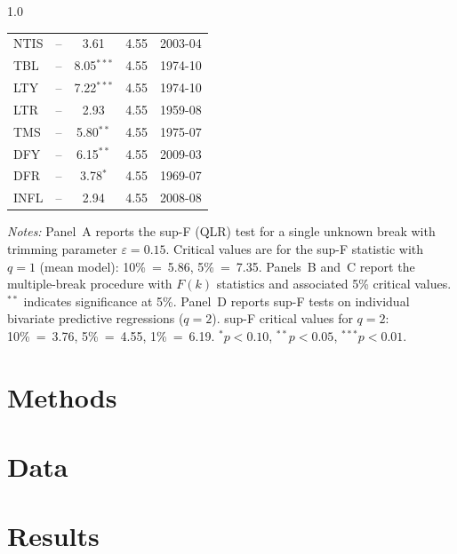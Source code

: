 \documentclass[a4paper,11pt]{article}
\begin{document}
\begin{spacing}{1.0}
\begin{table}[H]
\begin{tabular}{@{}lcccl@{}}
NTIS  & {--} &  3.61            & 4.55 & 2003-04 \\
TBL   & {--} &  8.05{$^{***}$} & 4.55 & 1974-10 \\
LTY   & {--} &  7.22{$^{***}$} & 4.55 & 1974-10 \\
LTR   & {--} &  2.93            & 4.55 & 1959-08 \\
TMS   & {--} &  5.80{$^{**}$}  & 4.55 & 1975-07 \\
DFY   & {--} &  6.15{$^{**}$}  & 4.55 & 2009-03 \\
DFR   & {--} &  3.78{$^{*}$}   & 4.55 & 1969-07 \\
INFL  & {--} &  2.94            & 4.55 & 2008-08 \\
\bottomrule
\end{tabular}
\vspace{0.4em}
\begin{minipage}{0.95\textwidth}
\footnotesize
\textit{Notes:} Panel~A reports the \citet{Andrews1993} sup-F (QLR) test for
a single unknown break with trimming parameter $\varepsilon = 0.15$.
Critical values are for the sup-F statistic with $q=1$ (mean model):
10\%~=~5.86, 5\%~=~7.35. Panels~B and~C report the \citet{BaiPerron2003}
multiple-break procedure with $F(k)$ statistics and associated 5\%
critical values. $^{**}$ indicates significance at 5\%.
Panel~D reports sup-F tests on individual bivariate predictive regressions
($q = 2$). sup-F critical values for $q = 2$: 10\%~=~3.76,
5\%~=~4.55, 1\%~=~6.19.
$^{*}\!p < 0.10$, $^{**}\!p < 0.05$, $^{***}\!p < 0.01$.
\end{minipage}
\end{table}
\end{spacing}




\newpage
\section{Methods}
\newpage
\section{Data}
\newpage
\section{Results}
\end{document}
